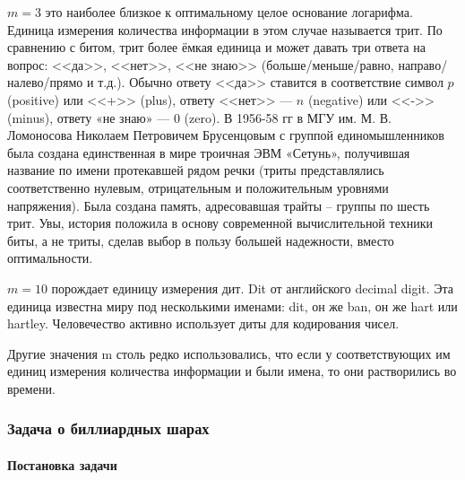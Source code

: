 $m=3$ это наиболее близкое к оптимальному целое основание логарифма. Единица измерения количества информации в этом случае называется трит. По сравнению с битом, трит более ёмкая единица и может давать три ответа на вопрос: <<да>>, <<нет>>, <<не знаю>> (больше/меньше/равно, направо/налево/прямо и т.д.). Обычно ответу <<да>> ставится в соответствие символ $p$ (positive) или <<+>> (plus), ответу <<нет>> --- $n$  (negative) или <<->> (minus), ответу «не знаю» --- 0 (zero). В 1956-58 гг в МГУ им. М. В. Ломоносова Николаем Петровичем Брусенцовым с группой единомышленников была создана единственная в мире троичная ЭВМ «Сетунь», получившая название по имени протекавшей рядом речки (триты представлялись соответственно нулевым, отрицательным и положительным уровнями напряжения). Была создана память, адресовавшая трайты – группы по шесть трит. Увы, история положила в основу современной вычислительной техники биты, а не триты, сделав выбор в пользу большей надежности, вместо оптимальности.

$m=10$ порождает единицу измерения дит. Dit от английского decimal digit. Эта единица известна миру под несколькими именами: dit, он же ban, он же hart или hartley. Человечество активно использует диты для кодирования чисел.

Другие значения m столь редко использовались, что если у соответствующих им единиц измерения количества информации и были имена, то они растворились во времени.


\begin{frame}
\frametitle{Задача о биллиардных шарах}
\framesubtitle{Постановка задачи}
\end{frame}

